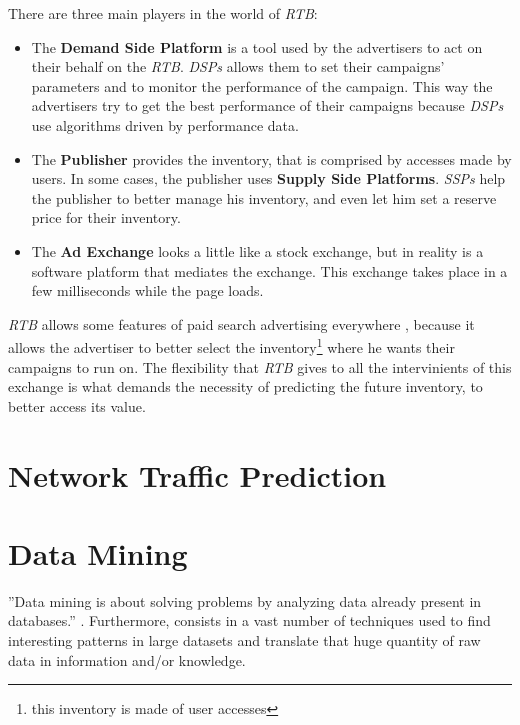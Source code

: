There are three main players in the world of \emph{RTB}:
\begin{itemize}
\item The \textbf{Demand Side Platform} is a tool used by the advertisers to act on their behalf on the \emph{RTB}. \emph{DSPs} allows them to set
their campaigns' parameters and to monitor the performance of the campaign. This way the advertisers try to get the best performance of their campaigns because 
\emph{DSPs} use algorithms driven by performance data.\cite{Gern201230}
\item The \textbf{Publisher} provides the inventory, that is comprised by accesses made by users. In some cases, the publisher uses \textbf{Supply Side Platforms}.
\emph{SSPs} help the publisher to better manage his inventory, and even let him set a reserve price for their inventory.\cite{Yuan:2013:RBO:2501040.2501980}
\item The \textbf{Ad Exchange} looks a little like a stock exchange, but in reality is a software platform that mediates the exchange. This exchange takes place in
a few milliseconds while the page loads.
\end{itemize}

\emph{RTB} allows some features of paid search advertising everywhere \cite{Gern201230}, because it allows the advertiser to better select
the inventory\footnote{ this inventory is made of user accesses} where he wants their campaigns to run on.
The flexibility that \emph{RTB} gives to all the intervinients of this exchange is what demands the necessity of predicting the future inventory, to
better access its value.


\section{Network Traffic Prediction}\label{sec:network}

\section{Data Mining}\label{sec:datamining}
''Data mining is about solving problems by analyzing data already present in databases.''\cite[p. 5]{Witten:2005:DMP:1205860}
. Furthermore, consists in a vast number of techniques used to find interesting patterns in large datasets and translate
that huge quantity of raw data in information and/or knowledge. 

